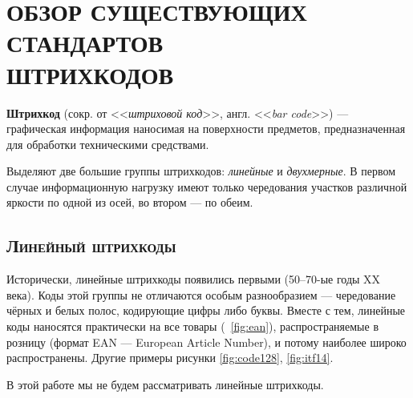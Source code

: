 \section{ОБЗОР СУЩЕСТВУЮЩИХ СТАНДАРТОВ \\ ШТРИХКОДОВ}

\textbf{Штрихкод} (сокр. от <<\textit{штриховой код}>>, англ. 
<<\textit{bar code}>>) --- графическая информация наносимая на 
поверхности предметов, предназначенная для обработки техническими
средствами.

Выделяют две большие группы штрихкодов: \textit{линейные} 
и \textit{двухмерные}.
В первом случае информационную нагрузку имеют только чередования 
участков различной яркости по одной из осей, во втором --- по обеим.


\subsection{\textsc{Линейный штрихкоды}}  

Исторически, линейные штрихкоды появились первыми (50--70-ые годы 
XX века). Коды этой группы не отличаются особым разнообразием ---
чередование чёрных и белых полос, кодирующие цифры либо буквы. Вместе
с тем, линейные коды наносятся практически на все товары 
(\figurename\ \ref{fig:ean}), 
распространяемые в розницу (формат EAN --- European Article Number),
и потому наиболее широко распространены. Другие примеры рисунки 
\ref{fig:code128}, \ref{fig:itf14}. 

В этой работе мы не будем рассматривать линейные штрихкоды.


